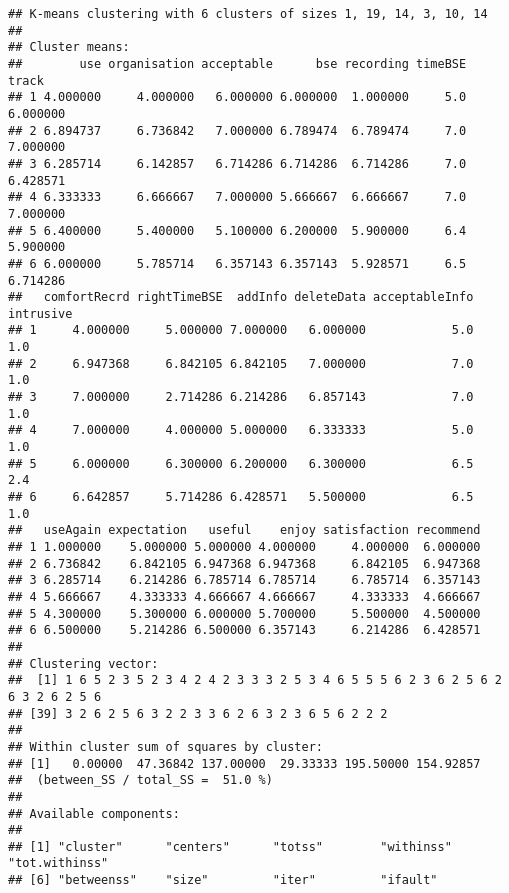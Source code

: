 \documentclass[
]{article}
\newenvironment{Shaded}{\begin{snugshade}}{\end{snugshade}}
\newcommand{\CommentTok}[1]{\textcolor[rgb]{0.56,0.35,0.01}{\textit{#1}}}
\newcommand{\NormalTok}[1]{#1}
\newcommand{\SpecialCharTok}[1]{\textcolor[rgb]{0.81,0.36,0.00}{\textbf{#1}}}
\begin{document}
\begin{verbatim}
## K-means clustering with 6 clusters of sizes 1, 19, 14, 3, 10, 14
## 
## Cluster means:
##        use organisation acceptable      bse recording timeBSE    track
## 1 4.000000     4.000000   6.000000 6.000000  1.000000     5.0 6.000000
## 2 6.894737     6.736842   7.000000 6.789474  6.789474     7.0 7.000000
## 3 6.285714     6.142857   6.714286 6.714286  6.714286     7.0 6.428571
## 4 6.333333     6.666667   7.000000 5.666667  6.666667     7.0 7.000000
## 5 6.400000     5.400000   5.100000 6.200000  5.900000     6.4 5.900000
## 6 6.000000     5.785714   6.357143 6.357143  5.928571     6.5 6.714286
##   comfortRecrd rightTimeBSE  addInfo deleteData acceptableInfo intrusive
## 1     4.000000     5.000000 7.000000   6.000000            5.0       1.0
## 2     6.947368     6.842105 6.842105   7.000000            7.0       1.0
## 3     7.000000     2.714286 6.214286   6.857143            7.0       1.0
## 4     7.000000     4.000000 5.000000   6.333333            5.0       1.0
## 5     6.000000     6.300000 6.200000   6.300000            6.5       2.4
## 6     6.642857     5.714286 6.428571   5.500000            6.5       1.0
##   useAgain expectation   useful    enjoy satisfaction recommend
## 1 1.000000    5.000000 5.000000 4.000000     4.000000  6.000000
## 2 6.736842    6.842105 6.947368 6.947368     6.842105  6.947368
## 3 6.285714    6.214286 6.785714 6.785714     6.785714  6.357143
## 4 5.666667    4.333333 4.666667 4.666667     4.333333  4.666667
## 5 4.300000    5.300000 6.000000 5.700000     5.500000  4.500000
## 6 6.500000    5.214286 6.500000 6.357143     6.214286  6.428571
## 
## Clustering vector:
##  [1] 1 6 5 2 3 5 2 3 4 2 4 2 3 3 3 2 5 3 4 6 5 5 5 6 2 3 6 2 5 6 2 6 3 2 6 2 5 6
## [39] 3 2 6 2 5 6 3 2 2 3 3 6 2 6 3 2 3 6 5 6 2 2 2
## 
## Within cluster sum of squares by cluster:
## [1]   0.00000  47.36842 137.00000  29.33333 195.50000 154.92857
##  (between_SS / total_SS =  51.0 %)
## 
## Available components:
## 
## [1] "cluster"      "centers"      "totss"        "withinss"     "tot.withinss"
## [6] "betweenss"    "size"         "iter"         "ifault"
\end{verbatim}

\begin{Shaded}
\end{Shaded}
\end{document}
